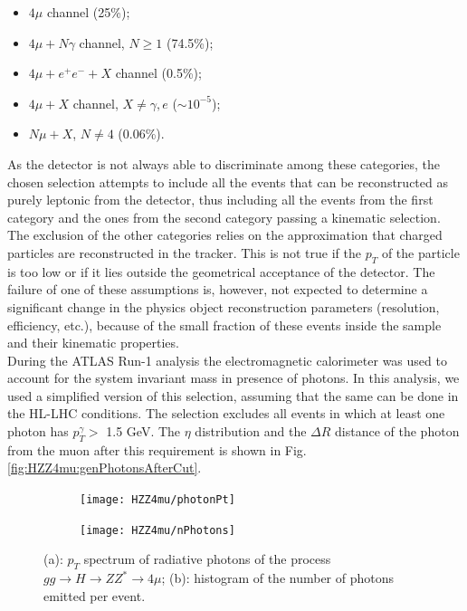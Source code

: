 \documentclass[a4paper,twoside,12pt]{book}
\begin{document}
\begin{itemize}
\item $4\mu$ channel (25\%);
\item $4\mu + N\gamma$ channel, $N \geq 1$ (74.5\%);
\item $4\mu + e^+e^- + X$ channel (0.5\%);
\item $4\mu + X$ channel, $X \neq \gamma, e$ ($\sim 10^{-5}$);
\item $N\mu + X$, $N \neq 4$ (0.06\%).
\end{itemize}

As the detector is not always able to discriminate among these categories, the chosen selection attempts to include all the events that can be reconstructed as purely leptonic from
the detector, thus including all the events
from the first category and the ones from the second category passing a kinematic 
selection. The exclusion of the other categories relies on the approximation that charged
particles are reconstructed in the tracker. This is not true if the $p_{T}$ of the particle is 
too low or if it lies outside the geometrical acceptance of the detector. The failure of one 
of these assumptions is, however, not expected to determine a significant change in the
physics object reconstruction parameters (resolution, efficiency, etc.), because of the
small fraction of these events inside the sample and their kinematic properties. \\

During the ATLAS Run-1 analysis the electromagnetic calorimeter was used to account for the system invariant mass in presence of photons\cite{HZZ4mu_run1}. In
this analysis, we used a simplified version of this selection, assuming that the same
can be done in the HL-LHC conditions. The selection excludes all events in which at least one photon has $p_{T}^{\gamma} >$ 1.5 GeV. The $\eta$ distribution
and the $\Delta R$ distance of the photon from the muon after this requirement is shown in Fig.\ref{fig:HZZ4mu:genPhotonsAfterCut}.\\

\begin{figure}
\centering
\begin{subfigure}{.5\textwidth}
  \centering
  \texttt{[image: HZZ4mu/photonPt]}
  \caption{}
  \label{fig:HZZ4mu:photonPt}
\end{subfigure}%
\begin{subfigure}{.5\textwidth}
  \centering
  \texttt{[image: HZZ4mu/nPhotons]}
  \caption{}
  \label{fig:HZZ4mu:nPhotons}
\end{subfigure}
\caption{(a): $p_T$ spectrum of radiative photons of the process \\
 \mbox{$gg \rightarrow H \rightarrow ZZ^* \rightarrow 4\mu$}; 
	(b): histogram of the number of photons emitted per event.}
\label{fig:HZZ4mu:genPhotons}
\end{figure}
\end{document}
